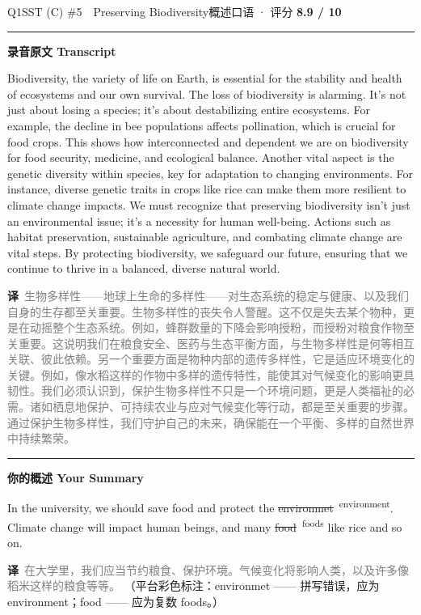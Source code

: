\documentclass[11pt]{article}
\newcommand{\fix}[2]{%
  \colorbox{cWrongBg}{\textcolor{cWrong}{\sout{#1}}}%
  \,\textsuperscript{\textcolor{cFix}{\footnotesize #2}}}
\newcommand{\ptesub}[1]{%
  \par\needspace{2\baselineskip}\smallskip
  {\color{cAccent}\rule[-0.2ex]{3pt}{1.05em}}\hspace{6pt}%
  {\bfseries\color{cHead}#1}\par\nopagebreak\smallskip}
\newcommand{\zh}[1]{{\footnotesize\textcolor{cNote}{\textbf{译}}\ \textcolor{gray}{#1}}}
\begin{document}

\begin{qblock}{Q1\quad SST (C) \#5\ \ Preserving Biodiversity}{概述口语 · 评分 \textcolor{cAccent}{\bfseries 8.9 / 10}}
\ptesub{录音原文 Transcript}
\begin{promptbox}
Biodiversity, the variety of life on Earth, is essential for the stability and health of ecosystems and our own survival. The loss of biodiversity is alarming. It's not just about losing a species; it's about destabilizing entire ecosystems. For example, the decline in bee populations affects pollination, which is crucial for food crops. This shows how interconnected and dependent we are on biodiversity for food security, medicine, and ecological balance. Another vital aspect is the genetic diversity within species, key for adaptation to changing environments. For instance, diverse genetic traits in crops like rice can make them more resilient to climate change impacts. We must recognize that preserving biodiversity isn't just an environmental issue; it's a necessity for human well-being. Actions such as habitat preservation, sustainable agriculture, and combating climate change are vital steps. By protecting biodiversity, we safeguard our future, ensuring that we continue to thrive in a balanced, diverse natural world.
\end{promptbox}
\zh{生物多样性——地球上生命的多样性——对生态系统的稳定与健康、以及我们自身的生存都至关重要。生物多样性的丧失令人警醒。这不仅是失去某个物种，更是在动摇整个生态系统。例如，蜂群数量的下降会影响授粉，而授粉对粮食作物至关重要。这说明我们在粮食安全、医药与生态平衡方面，与生物多样性是何等相互关联、彼此依赖。另一个重要方面是物种内部的遗传多样性，它是适应环境变化的关键。例如，像水稻这样的作物中多样的遗传特性，能使其对气候变化的影响更具韧性。我们必须认识到，保护生物多样性不只是一个环境问题，更是人类福祉的必需。诸如栖息地保护、可持续农业与应对气候变化等行动，都是至关重要的步骤。通过保护生物多样性，我们守护自己的未来，确保能在一个平衡、多样的自然世界中持续繁荣。}
\ptesub{你的概述 Your Summary}
\begin{youbox}
In the university, we should save food and protect the \fix{environmet}{environment}. Climate change will impact human beings, and many \fix{food}{foods} like rice and so on.
\end{youbox}
\zh{在大学里，我们应当节约粮食、保护环境。气候变化将影响人类，以及许多像稻米这样的粮食等等。}
{\footnotesize\color{gray}（平台彩色标注：environmet —— 拼写错误，应为 environment；food —— 应为复数 foods。）}

\end{qblock}
\end{document}

